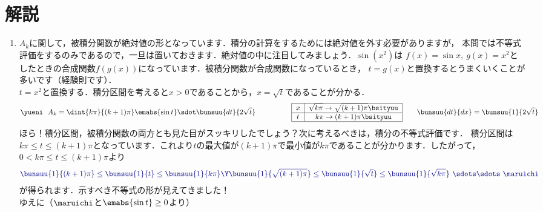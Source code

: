 \documentclass[../../../doc/main]{subfiles}
\begin{document}
    \setcounter{chapter}{1}
    \setcounter{section}{2}
    \section{解説}\label{解説1}
        \begin{enumerate}
            \item [\kakkoichi]
            \textcolor{myBlue2}{$A_k$に関して，被積分関数が絶対値の形となっています．積分の計算をするためには絶対値を外す必要がありますが，
            本問では不等式評価をするのみであるので，一旦は置いておきます．絶対値の中に注目してみましょう．$\sin{(x^2)}$は
            $f(x)=\sin{x},~g(x)=x^2$としたときの合成関数$f(g(x))$になっています．被積分関数が合成関数になっているとき，
            $t=g(x)$と置換するとうまくいくことが多いです（経験則です）．}\\
            $t=x^2$と置換する．積分区間を考えると$x>0$であることから，$x=\sqrt{t}$であることが分かる．
            \begin{align*}
                \yueni~~A_k=\dint{k\pi}{(k+1)\pi}\emabs{\sin{t}}\sdot\bunsuu{dt}{2\sqrt{t}}
                \quad\quad\quad\quad\quad
                \begin{tabular}{|c|c|} \hline
                    $x$ & $\sqrt{k\pi}\to\sqrt{(k+1)\pi}$\bsityuu \\ \hline
                    $t$ & $k\pi\to(k+1)\pi$\bsityuu \\ \hline
                \end{tabular}
                \quad\quad \bunsuu{dt}{dx}=\bunsuu{1}{2\sqrt{t}}
            \end{align*}
            \textcolor{myBlue2}{ほら！積分区間，被積分関数の両方とも見た目がスッキリしたでしょう？次に考えるべきは，積分の不等式評価です．
            積分区間は$k\pi\leq t\leq(k+1)\pi$となっています．これより$t$の最大値が$(k+1)\pi$で最小値が$k\pi$であることが分かります．したがって，
            $0<k\pi\leq t\leq(k+1)\pi$より}
            \begin{align*}
                \textcolor{myBlue2}{\bunsuu{1}{(k+1)\pi}\leq \bunsuu{1}{t}\leq \bunsuu{1}{k\pi}\Y \bunsuu{1}{\sqrt{(k+1)\pi}}\leq \bunsuu{1}{\sqrt{t}}\leq \bunsuu{1}{\sqrt{k\pi}}~\sdots\sdots~\maruichi}
            \end{align*}
            \textcolor{myBlue2}{が得られます．示すべき不等式の形が見えてきました！}\\
            ゆえに\textcolor{myBlue2}{（$\maruichi$と$\emabs{\sin{t}}\geq 0$より）}
            \begin{align*}

\end{align*}
\end{enumerate}
\end{document}
